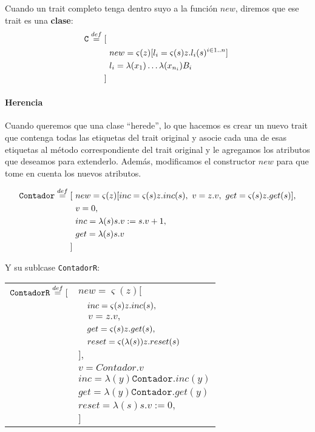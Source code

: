 Cuando un trait completo tenga dentro suyo a la función $new$, diremos que ese trait es una \textbf{clase}:
\begin{align*}
\texttt{C}\overset{def}{=} [~& \\ &new = \varsigma(z)[l_i = \varsigma(s)z.l_i(s)^{i\in 1..n}]~\\
&l_i = \lambda(x_{1})\dots\lambda(x_{n_i})B_i \\
]~&
\end{align*}
\paragraph{Herencia} Cuando queremos que una clase ``herede'', lo que hacemos es crear un nuevo trait que contenga todas las etiquetas del trait original y asocie cada una de esas etiquetas al método correspondiente del trait original y le agregamos los atributos que deseamos para extenderlo. Además, modificamos el constructor $new$ para que tome en cuenta los nuevos atributos.

\vspace*{5mm}
\begin{align*}
\texttt{Contador}\overset{def}{=} [~&
new = \varsigma(z)[inc = \varsigma(s)z.inc(s),~v = z.v,~ get = \varsigma(s)z.get(s) ], \\
 & v = 0, \\
 & inc = \lambda(s) s.v := s.v + 1, \\
 & get = \lambda(s) s.v \\
 ]~&  \\
\end{align*}

Y su sublcase \texttt{ContadorR}:

\vspace*{5mm}
\begin{tabular}{ll}
$\texttt{ContadorR}\overset{def}{=} [$ &
$new = \varsigma(z)[$
\\ & $\quad inc = \varsigma(s)z.inc(s),$ \\ 
 & $\quad v = z.v,$ \\
 & $\quad get = \varsigma(s)z.get(s),$ \\
 & $\quad reset = \varsigma(\lambda(s))z.reset(s) $ \\
 & $ ],$ \\
& $v = Contador.v$ \\
& $inc = \lambda(y)\texttt{Contador}.inc(y)$ \\
& $get = \lambda(y)\texttt{Contador}.get(y)$ \\
& $reset = \lambda(s) s.v := 0,$ \\
& $]$ \\
\end{tabular}


